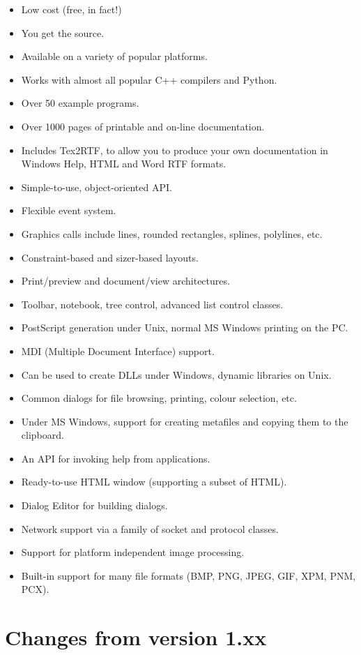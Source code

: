 \begin{itemize}\itemsep=0pt
\item Low cost (free, in fact!)
\item You get the source.
\item Available on a variety of popular platforms.
\item Works with almost all popular C++ compilers and Python.
\item Over 50 example programs.
\item Over 1000 pages of printable and on-line documentation.
\item Includes Tex2RTF, to allow you to produce your own documentation
in Windows Help, HTML and Word RTF formats.
\item Simple-to-use, object-oriented API.
\item Flexible event system.
\item Graphics calls include lines, rounded rectangles, splines, polylines, etc.
\item Constraint-based and sizer-based layouts.
\item Print/preview and document/view architectures.
\item Toolbar, notebook, tree control, advanced list control classes.
\item PostScript generation under Unix, normal MS Windows printing on the PC.
\item MDI (Multiple Document Interface) support.
\item Can be used to create DLLs under Windows, dynamic libraries on Unix.
\item Common dialogs for file browsing, printing, colour selection, etc.
\item Under MS Windows, support for creating metafiles and copying
them to the clipboard.
\item An API for invoking help from applications.
\item Ready-to-use HTML window (supporting a subset of HTML).
\item Dialog Editor for building dialogs.
\item Network support via a family of socket and protocol classes.
\item Support for platform independent image processing.
\item Built-in support for many file formats (BMP, PNG, JPEG, GIF, XPM, PNM, PCX).
\end{itemize}

\section{Changes from version 1.xx}\label{versionchanges}

